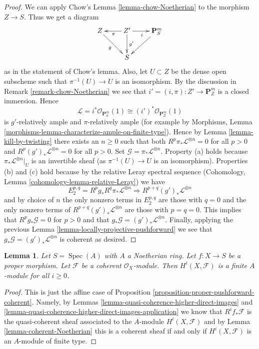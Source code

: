 \documentclass{stacks-project}
\theoremstyle{plain}
\newtheorem{lemma}[subsection]{Lemma}
\theoremstyle{definition}
\theoremstyle{remark}
\numberwithin{equation}{subsection}
\def\Spec{\mathop{\mathrm{Spec}}}
\begin{document}
\begin{proof}
\medskip\noindent
We can apply Chow's Lemma \ref{lemma-chow-Noetherian}
to the morphism $Z \to S$. Thus we get a diagram
$$
\xymatrix{
Z \ar[rd]_g & Z' \ar[d]^-{g'} \ar[l]^\pi \ar[r]_i & \mathbf{P}^m_S \ar[dl] \\
& S &
}
$$
as in the statement of Chow's lemma. Also, let $U \subset Z$ be
the dense open subscheme such that $\pi^{-1}(U) \to U$ is an isomorphism.
By the discussion in Remark \ref{remark-chow-Noetherian} we see that
$i' = (i, \pi) : Z' \to \mathbf{P}^m_Z$ is
a closed immersion. Hence
$$
\mathcal{L} = i^*\mathcal{O}_{\mathbf{P}^m_S}(1) \cong
(i')^*\mathcal{O}_{\mathbf{P}^m_Z}(1)
$$
is $g'$-relatively ample and $\pi$-relatively ample (for example by
Morphisms, Lemma \ref{morphisms-lemma-characterize-ample-on-finite-type}).
Hence by Lemma \ref{lemma-kill-by-twisting}
there exists an $n \geq 0$ such that
both $R^p\pi_*\mathcal{L}^{\otimes n} = 0$ for all $p > 0$ and
$R^p(g')_*\mathcal{L}^{\otimes n} = 0$ for all $p > 0$.
Set $\mathcal{G} = \pi_*\mathcal{L}^{\otimes n}$.
Property (a) holds because $\pi_*\mathcal{L}^{\otimes n}|_U$ is
an invertible sheaf (as $\pi^{-1}(U) \to U$ is an isomorphism).
Properties (b) and (c) hold because by the relative Leray
spectral sequence
(Cohomology, Lemma \ref{cohomology-lemma-relative-Leray})
we have
$$
E_2^{p, q} = R^pg_* R^q\pi_*\mathcal{L}^{\otimes n}
\Rightarrow
R^{p + q}(g')_*\mathcal{L}^{\otimes n}
$$
and by choice of $n$ the only nonzero terms in $E_2^{p, q}$ are
those with $q = 0$ and the only nonzero terms of
$R^{p + q}(g')_*\mathcal{L}^{\otimes n}$ are those with $p = q = 0$.
This implies that $R^pg_*\mathcal{G} = 0$ for $p > 0$ and
that $g_*\mathcal{G} = (g')_*\mathcal{L}^{\otimes n}$.
Finally, applying the previous
Lemma \ref{lemma-locally-projective-pushforward}
we see that $g_*\mathcal{G} = (g')_*\mathcal{L}^{\otimes n}$ is
coherent as desired.
\end{proof}

\begin{lemma}
\label{lemma-proper-over-affine-cohomology-finite}
Let $S = \Spec(A)$ with $A$ a Noetherian ring.
Let $f : X \to S$ be a proper morphism.
Let $\mathcal{F}$ be a coherent $\mathcal{O}_X$-module.
Then $H^i(X, \mathcal{F})$ is a finite $A$-module for all $i \geq 0$.
\end{lemma}

\begin{proof}
This is just the affine case of
Proposition \ref{proposition-proper-pushforward-coherent}.
Namely, by Lemmas \ref{lemma-quasi-coherence-higher-direct-images} and
\ref{lemma-quasi-coherence-higher-direct-images-application} we know that
$R^if_*\mathcal{F}$ is the quasi-coherent sheaf associated
to the $A$-module $H^i(X, \mathcal{F})$
and by Lemma \ref{lemma-coherent-Noetherian} this is
a coherent sheaf if and only if $H^i(X, \mathcal{F})$
is an $A$-module of finite type.
\end{proof}
\end{document}
